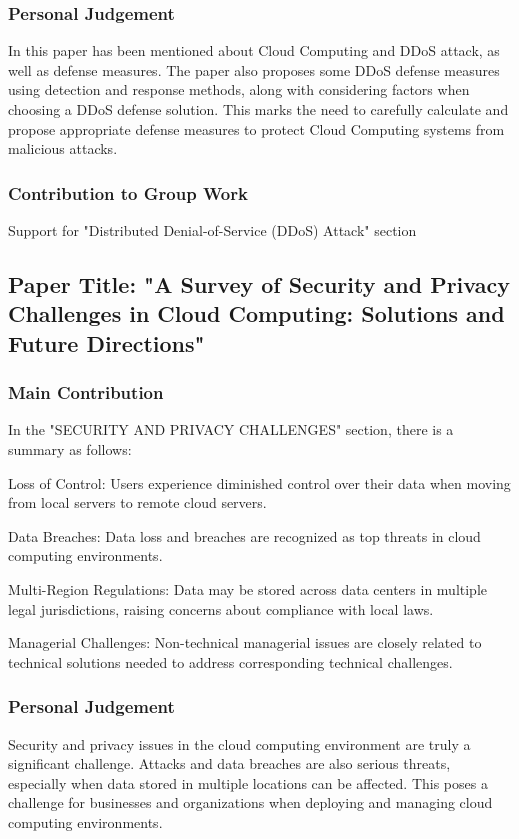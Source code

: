 \documentclass[12pt, twoside]{article}
\begin{document}
\subsubsection{Personal Judgement}
In this paper has been mentioned about Cloud Computing and DDoS attack, as well as defense measures. The paper also proposes some DDoS defense measures using detection and response methods, along with considering factors when choosing a DDoS defense solution. This marks the need to carefully calculate and propose appropriate defense measures to protect Cloud Computing systems from malicious attacks.
\subsubsection{Contribution to Group Work}
Support for "Distributed Denial-of-Service (DDoS) Attack" section
\subsection{Paper Title: "A Survey of Security and Privacy Challenges in Cloud Computing: Solutions and Future Directions" \cite{liu2015survey}}
\subsubsection{Main Contribution}

In the "SECURITY AND PRIVACY CHALLENGES" section, there is a summary as follows:

Loss of Control: Users experience diminished control over their data when moving from local servers to remote cloud servers.

Data Breaches: Data loss and breaches are recognized as top threats in cloud computing environments.

Multi-Region Regulations: Data may be stored across data centers in multiple legal jurisdictions, raising concerns about compliance with local laws.

Managerial Challenges: Non-technical managerial issues are closely related to technical solutions needed to address corresponding technical challenges.



\subsubsection{Personal Judgement}

Security and privacy issues in the cloud computing environment are truly a significant challenge. Attacks and data breaches are also serious threats, especially when data stored in multiple locations can be affected. This poses a challenge for businesses and organizations when deploying and managing cloud computing environments.
\end{document}
